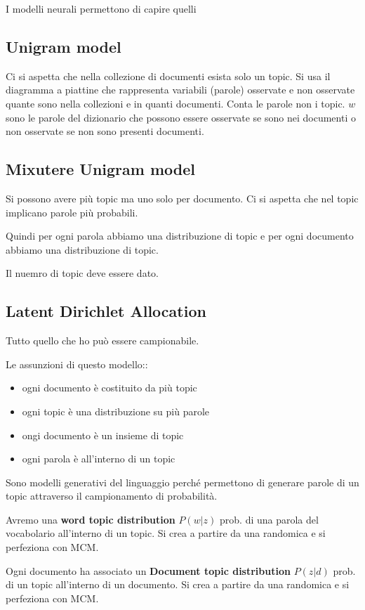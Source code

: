I modelli neurali permettono di capire quelli 
\subsection{Unigram model}
Ci si aspetta che nella collezione di documenti esista solo un topic. Si usa il 
diagramma a piattine che rappresenta variabili (parole) osservate e non osservate
quante sono nella collezioni e in quanti documenti. Conta le parole non i topic.
$w$ sono le parole del dizionario che possono essere osservate se sono nei documenti 
o non  osservate se non sono presenti documenti.
\subsection{Mixutere Unigram model}
Si possono avere più topic ma uno solo per documento. Ci si aspetta che nel topic 
implicano parole più probabili.

Quindi per ogni parola abbiamo una distribuzione di topic e per ogni documento 
abbiamo una distribuzione di topic.

Il nuemro di topic deve essere dato.

\subsection{Latent Dirichlet Allocation}
Tutto quello che ho può essere campionabile.

Le assunzioni di questo modello::
\begin{itemize}
      \item ogni documento è costituito da più topic
      \item ogni topic è una distribuzione su più parole
      \item ongi documento è un insieme di topic
      \item ogni parola è all'interno di un topic
\end{itemize}

Sono modelli generativi del linguaggio perché permettono di generare parole di un 
topic attraverso il campionamento di probabilità.

Avremo una \textbf{word topic distribution} $P(w|z)$ prob. di una parola del vocabolario 
all'interno di un topic. Si crea a partire da una randomica e si perfeziona con
MCM.

Ogni documento ha associato un \textbf{Document topic distribution} $P(z|d)$ prob. di un topic 
all'interno di un documento. Si crea a partire da una randomica e si perfeziona con
MCM.

